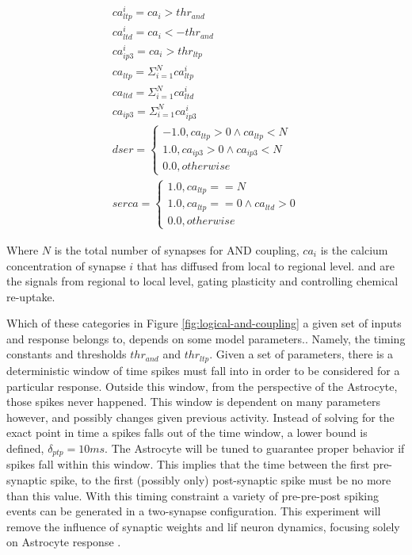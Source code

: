 \begin{align}
  ca^i_{ltp} = ca_i > thr_{and} \label{eq:ca_and_ltp} \\
  ca^i_{ltd} = ca_i < -thr_{and} \\
  ca^i_{ip3} = ca_i > thr_{ltp} \\
  ca_{ltp} = \Sigma_{i=1}^N ca_{ltp}^i \\
  ca_{ltd} = \Sigma_{i=1}^N ca_{ltd}^i \\
  ca_{ip3} = \Sigma_{i=1}^N ca_{ip3}^i \\
  dser =
  \begin{cases} 
    -1.0, ca_{ltp} > 0 \land ca_{ltp} < N \\
    1.0, ca_{ip3} > 0 \land ca_{ip3} < N \\
    0.0, otherwise
  \end{cases} \label{eq:dser_cases} \\
  serca =
  \begin{cases}
    1.0, ca_{ltp} == N \\
    1.0, ca_{ltp} == 0 \land ca_{ltd} > 0 \\
    0.0, otherwise 
  \end{cases} \label{eq:serca_cases}
\end{align}

Where $N$ is the total number of synapses for AND coupling, $ca_i$ is the
calcium concentration of synapse $i$ that has diffused from local to regional
level. \dser and \serca are the signals from regional to local level, gating
plasticity and controlling chemical re-uptake.

Which of these categories in Figure \ref{fig:logical-and-coupling} a given set
of inputs and response belongs to, depends on some model parameters.. Namely,
the timing constants and thresholds $thr_{and}$ and $thr_{ltp}$. Given a
set of parameters, there is a deterministic window of time spikes must fall into
in order to be considered for a particular response. Outside this window, from
the perspective of the Astrocyte, those spikes never happened. This window is
dependent on many parameters however, and possibly changes given previous
activity. Instead of solving for the exact point in time a spikes falls out of
the time window, a lower bound is defined, $\delta_{ptp}=10ms$. The Astrocyte
will be tuned to guarantee proper behavior if spikes fall within this
window. This implies that the time between the first pre-synaptic spike, to the
first (possibly only) post-synaptic spike must be no more than this value. With
this timing constraint a variety of pre-pre-post spiking events can be generated
in a two-synapse configuration. This experiment will remove the influence of
synaptic weights and \Gls{lif} neuron dynamics, focusing solely on Astrocyte
response \ca.


